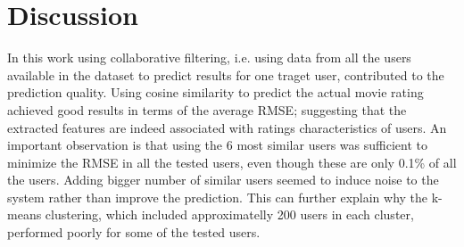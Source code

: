 \section{Discussion}
\label{sec:discussion}

In this work using collaborative filtering, i.e. using data from all the users available in the dataset to predict results for one traget user, contributed to the prediction quality. Using cosine similarity to predict the actual movie rating achieved good results in terms of the average RMSE; suggesting that the extracted features are indeed associated with ratings characteristics of users. An important observation is that using the 6 most similar users was sufficient to minimize the RMSE in all the tested users, even though these are only 0.1\% of all the users. Adding bigger number of similar users seemed to induce noise to the system rather than improve the prediction. This can further explain why the k-means clustering, which included approximatelly 200 users in each cluster, performed poorly for some of the tested users.

